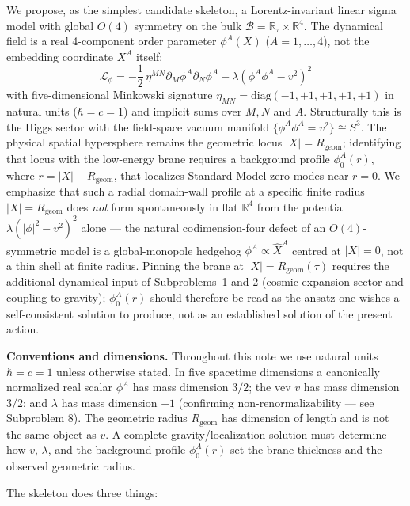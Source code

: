 \documentclass[11pt,a4paper]{article}
\newcommand{\Rgeom}{R_{\mathrm{geom}}}
\begin{document}
We propose, as the simplest candidate skeleton, a Lorentz-invariant linear sigma model with global $O(4)$ symmetry on the bulk $\mathcal{B} = \mathbb{R}_\tau \times \mathbb{R}^4$. The dynamical field is a real 4-component order parameter $\phi^A(X)$ ($A = 1,\dots,4$), not the embedding coordinate $X^A$ itself:
\begin{equation}
\mathcal{L}_\phi = -\frac{1}{2}\, \eta^{MN} \partial_M \phi^A \partial_N \phi^A - \lambda \left( \phi^A \phi^A - v^2 \right)^2
\end{equation}
with five-dimensional Minkowski signature $\eta_{MN} = \mathrm{diag}(-1, +1, +1, +1, +1)$ in natural units ($\hbar=c=1$) and implicit sums over $M,N$ and $A$. Structurally this is the Higgs sector with the field-space vacuum manifold $\{\phi^A\phi^A=v^2\}\cong S^3$. The physical spatial hypersphere remains the geometric locus $\lvert X\rvert=\Rgeom$; identifying that locus with the low-energy brane requires a background profile $\phi_0^A(r)$, where $r=\lvert X\rvert-\Rgeom$, that localizes Standard-Model zero modes near $r=0$. We emphasize that such a radial domain-wall profile at a specific finite radius $|X|=\Rgeom$ does \emph{not} form spontaneously in flat $\mathbb{R}^4$ from the potential $\lambda(|\phi|^2-v^2)^2$ alone --- the natural codimension-four defect of an $O(4)$-symmetric model is a global-monopole hedgehog $\phi^A\propto \hat X^A$ centred at $|X|=0$, not a thin shell at finite radius. Pinning the brane at $|X|=\Rgeom(\tau)$ requires the additional dynamical input of Subproblems~1 and 2 (cosmic-expansion sector and coupling to gravity); $\phi_0^A(r)$ should therefore be read as the ansatz one wishes a self-consistent solution to produce, not as an established solution of the present action.

\textbf{Conventions and dimensions.} Throughout this note we use natural units $\hbar=c=1$ unless otherwise stated. In five spacetime dimensions a canonically normalized real scalar $\phi^A$ has mass dimension $3/2$; the vev $v$ has mass dimension $3/2$; and $\lambda$ has mass dimension $-1$ (confirming non-renormalizability --- see Subproblem 8). The geometric radius $\Rgeom$ has dimension of length and is not the same object as $v$. A complete gravity/localization solution must determine how $v$, $\lambda$, and the background profile $\phi_0^A(r)$ set the brane thickness and the observed geometric radius.

The skeleton does three things:
\end{document}
